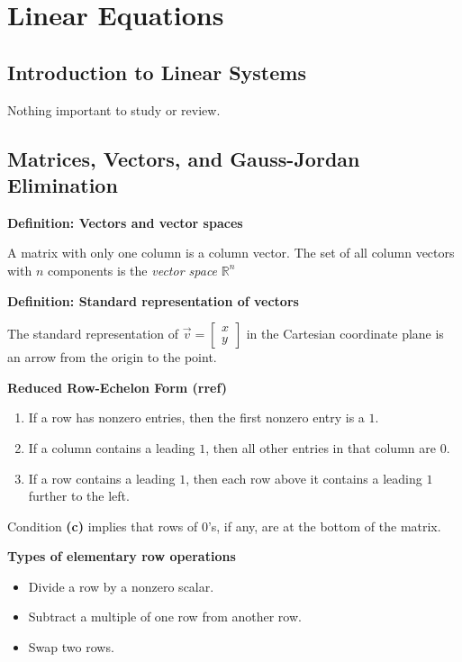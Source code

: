 

\section{Linear Equations}

\subsection{Introduction to Linear Systems}
\par Nothing important to study or review.\\
\pagebreak

\subsection{Matrices, Vectors, and Gauss-Jordan Elimination}
\par\noindent\textbf{Definition: Vectors and vector spaces}
\par\noindent A matrix with only one column is a column vector. The set of all column vectors with $n$ components is the \textit{vector space} $\mathbb{R}^{n}$\\
\par\noindent\textbf{Definition: Standard representation of vectors}
\par\noindent The standard representation of $\vec{v}=\left[\begin{array}{c}x\\y\end{array}\right]$ in the Cartesian coordinate plane is an arrow from the origin to the point.\\
\par\noindent\textbf{Reduced Row-Echelon Form (rref)}
\renewcommand{\labelenumi}{\textbf{(\alph{enumi})}}
\begin{enumerate}
\item If a row has nonzero entries, then the first nonzero entry is a $1$.
\item If a column contains a leading $1$, then all other entries in that column are $0$.
\item If a row contains a leading $1$, then each row above it contains a leading $1$ further to the left.
\end{enumerate}
\par\noindent Condition \textbf{(c)} implies that rows of $0$'s, if any, are at the bottom of the matrix.\\
\par\noindent\textbf{Types of elementary row operations}
\begin{itemize}
\item Divide a row by a nonzero scalar.
\item Subtract a multiple of one row from another row.
\item Swap two rows.
\end{itemize}
\pagebreak

